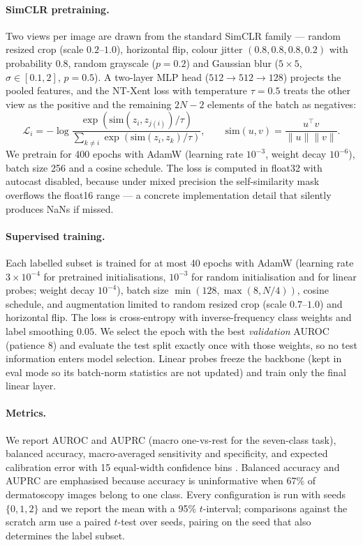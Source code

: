\documentclass{article}
\begin{document}
\paragraph{SimCLR pretraining.} Two views per image are drawn from the standard SimCLR
family --- random resized crop (scale $0.2$--$1.0$), horizontal flip, colour jitter
$(0.8,0.8,0.8,0.2)$ with probability $0.8$, random grayscale ($p{=}0.2$) and Gaussian
blur ($5\times5$, $\sigma\in[0.1,2]$, $p{=}0.5$). A two-layer MLP head
($512\rightarrow512\rightarrow128$) projects the pooled features, and the NT-Xent loss
\citep{chen2020simclr} with temperature $\tau=0.5$ treats the other view as the positive
and the remaining $2N-2$ elements of the batch as negatives:
\begin{equation}
\mathcal{L}_{i} = -\log \frac{\exp(\mathrm{sim}(z_i, z_{j(i)})/\tau)}
{\sum_{k \neq i} \exp(\mathrm{sim}(z_i, z_k)/\tau)}, \qquad
\mathrm{sim}(u,v) = \frac{u^\top v}{\lVert u\rVert \lVert v\rVert}.
\end{equation}
We pretrain for 400 epochs with AdamW \citep{loshchilov2019adamw} (learning rate
$10^{-3}$, weight decay $10^{-6}$), batch size 256 and a cosine schedule. The loss is
computed in float32 with autocast disabled, because under mixed precision the
self-similarity mask overflows the float16 range --- a concrete implementation detail
that silently produces NaNs if missed.

\paragraph{Supervised training.} Each labelled subset is trained for at most 40 epochs
with AdamW (learning rate $3\times10^{-4}$ for pretrained initialisations,
$10^{-3}$ for random initialisation and for linear probes; weight decay $10^{-4}$),
batch size $\min(128, \max(8, N/4))$, cosine schedule, and augmentation limited to random
resized crop (scale $0.7$--$1.0$) and horizontal flip. The loss is cross-entropy with
inverse-frequency class weights and label smoothing $0.05$. We select the epoch with the
best \emph{validation} AUROC (patience 8) and evaluate the test split exactly once with
those weights, so no test information enters model selection. Linear probes freeze the
backbone (kept in eval mode so its batch-norm statistics are not updated) and train only
the final linear layer.

\paragraph{Metrics.} We report AUROC and AUPRC (macro one-vs-rest for the seven-class
task), balanced accuracy, macro-averaged sensitivity and specificity, and expected
calibration error with 15 equal-width confidence bins \citep{guo2017calibration}.
Balanced accuracy and AUPRC are emphasised because accuracy is uninformative when 67\% of
dermatoscopy images belong to one class. Every configuration is run with seeds
$\{0,1,2\}$ and we report the mean with a 95\% $t$-interval; comparisons against the
scratch arm use a paired $t$-test over seeds, pairing on the seed that also determines
the label subset.
\end{document}
